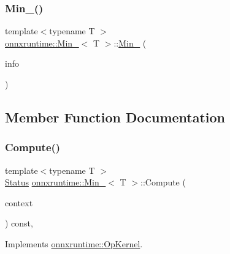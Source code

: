 \subsubsection{\texorpdfstring{Min\+\_()}{Min\_6()}}
{\footnotesize\ttfamily template$<$typename T $>$ \\
\mbox{\hyperlink{classonnxruntime_1_1Min__6}{onnxruntime\+::\+Min\+\_}}$<$ T $>$\+::\mbox{\hyperlink{classonnxruntime_1_1Min__6}{Min\+\_}} (\begin{DoxyParamCaption}\item[{const \mbox{\hyperlink{classonnxruntime_1_1OpKernelInfo}{Op\+Kernel\+Info}} \&}]{info }\end{DoxyParamCaption})\hspace{0.3cm}{\ttfamily [inline]}}



\subsection{Member Function Documentation}
\mbox{\label{classonnxruntime_1_1Min__6_a56323e33a57d2bc86d21bd3f21fff70c}} 
\subsubsection{\texorpdfstring{Compute()}{Compute()}\hspace{0.1cm}{\footnotesize\ttfamily [1/2]}}
{\footnotesize\ttfamily template$<$typename T $>$ \\
\mbox{\hyperlink{classonnxruntime_1_1common_1_1Status}{Status}} \mbox{\hyperlink{classonnxruntime_1_1Min__6}{onnxruntime\+::\+Min\+\_}}$<$ T $>$\+::Compute (\begin{DoxyParamCaption}\item[{\mbox{\hyperlink{classonnxruntime_1_1OpKernelContext}{Op\+Kernel\+Context}} $\ast$}]{context }\end{DoxyParamCaption}) const\hspace{0.3cm}{\ttfamily [override]}, {\ttfamily [virtual]}}



Implements \mbox{\hyperlink{classonnxruntime_1_1OpKernel_a9eca8656a78b1b3ab9d3351a12798650}{onnxruntime\+::\+Op\+Kernel}}.

\mbox{\label{classonnxruntime_1_1Min__6_ad9fb93014523edd7e994d2ecdb20714a}} 
